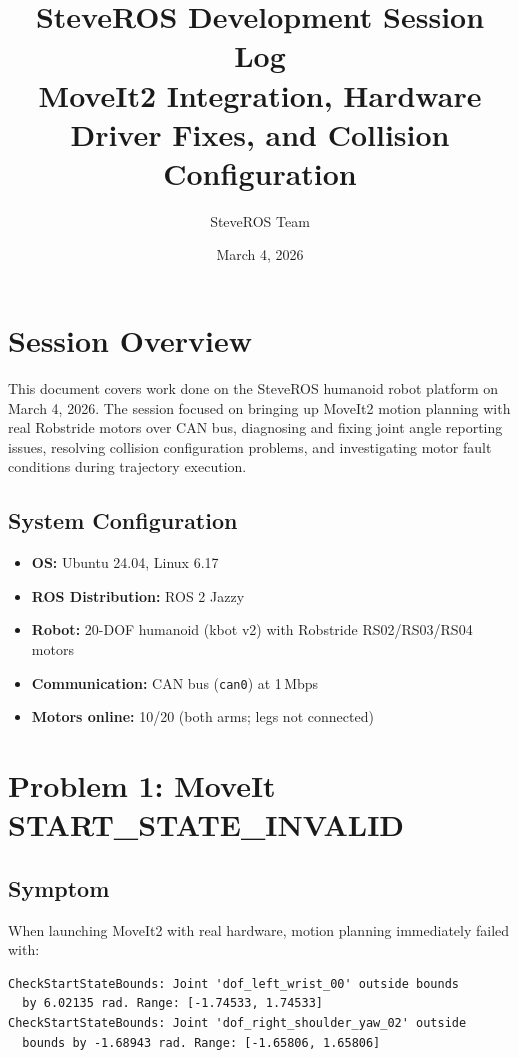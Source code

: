 \documentclass[11pt,a4paper]{article}
\title{SteveROS Development Session Log\\[0.5em]
\large MoveIt2 Integration, Hardware Driver Fixes, and Collision Configuration}
\author{SteveROS Team}
\date{March 4, 2026}
\begin{document}
\maketitle
\tableofcontents
\newpage

\section{Session Overview}

This document covers work done on the SteveROS humanoid robot platform on March 4, 2026.
The session focused on bringing up MoveIt2 motion planning with real Robstride motors
over CAN bus, diagnosing and fixing joint angle reporting issues, resolving collision
configuration problems, and investigating motor fault conditions during trajectory execution.

\subsection{System Configuration}
\begin{itemize}
  \item \textbf{OS:} Ubuntu 24.04, Linux 6.17
  \item \textbf{ROS Distribution:} ROS 2 Jazzy
  \item \textbf{Robot:} 20-DOF humanoid (kbot v2) with Robstride RS02/RS03/RS04 motors
  \item \textbf{Communication:} CAN bus (\texttt{can0}) at 1\,Mbps
  \item \textbf{Motors online:} 10/20 (both arms; legs not connected)
\end{itemize}

\section{Problem 1: MoveIt START\_STATE\_INVALID}

\subsection{Symptom}
When launching MoveIt2 with real hardware, motion planning immediately failed with:

\begin{lstlisting}[language={}]
CheckStartStateBounds: Joint 'dof_left_wrist_00' outside bounds
  by 6.02135 rad. Range: [-1.74533, 1.74533]
CheckStartStateBounds: Joint 'dof_right_shoulder_yaw_02' outside
  bounds by -1.68943 rad. Range: [-1.65806, 1.65806]
\end{lstlisting}
\end{document}
